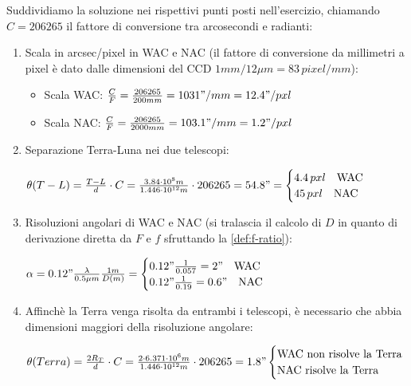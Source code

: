 \begin{sol}
	Suddividiamo la soluzione nei rispettivi punti posti nell'esercizio, chiamando $C=206265$ il fattore di conversione tra arcosecondi e radianti:
	\begin{enumerate}
		\item Scala in arcsec/pixel in WAC e NAC (il fattore di conversione da millimetri a pixel è dato dalle dimensioni del CCD $1mm / 12\mu m = 83 \,pixel / mm$):
		\begin{itemize}
			\item Scala WAC: $\frac{C}{F}=\frac{206265}{200mm}=1031"/mm=12.4"/pxl$
			\item Scala NAC: $\frac{C}{F}=\frac{206265}{2000mm}=103.1"/mm=1.2"/pxl$
		\end{itemize}
		\item Separazione Terra-Luna nei due telescopi:
		
		$
		\theta(T-L)=\frac{T-L}{d}\cdot C=\frac{3.84\cdot 10^{8}m}{1.446\cdot 10^{12}m}\cdot 206265=54.8"=
		\begin{cases}
			4.4 \, pxl \quad \text{WAC} \\
			45 \, pxl \quad \text{NAC}
		\end{cases}
		$
		\item Risoluzioni angolari di WAC e NAC (si tralascia il calcolo di $D$ in quanto di derivazione diretta da $F$ e $f$ sfruttando la \ref{def:f-ratio}):
		
		$
		\alpha=0.12"\frac{\lambda}{0.5\mu m}\frac{1m}{D(m)}=
		\begin{cases}
			0.12"\frac{1}{0.057}=2" \quad \text{WAC} \\
			0.12"\frac{1}{0.19}=0.6"\quad \text{NAC}
		\end{cases}
		$
		\item Affinchè la Terra venga risolta da entrambi i telescopi, è necessario che abbia dimensioni maggiori della risoluzione angolare:
		
		$
		\theta(Terra)=\frac{2R_T}{d}\cdot C=\frac{2\cdot 6.371\cdot 10^{6}m}{1.446\cdot 10^{12}m}\cdot 206265=1.8"
		\begin{cases}
			\text{WAC non risolve la Terra} \\
			\text{NAC risolve la Terra}
		\end{cases}
		$
	\end{enumerate}
\end{sol}


